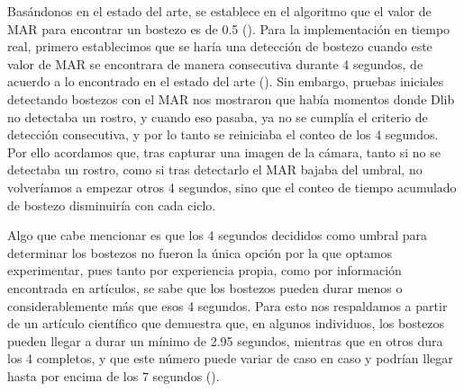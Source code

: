 Basándonos en el estado del arte, se establece en el algoritmo que el valor de MAR para encontrar un bostezo es de 0.5 (\cite{Bostezo}). Para la implementación en tiempo real, primero establecimos que se haría una detección de bostezo cuando este valor de MAR se encontrara de manera consecutiva durante 4 segundos, de acuerdo a lo encontrado en el estado del arte (\cite{Bostezo}). Sin embargo, pruebas iniciales detectando bostezos con el MAR nos mostraron que había momentos donde Dlib no detectaba un rostro, y cuando eso pasaba, ya no se cumplía el criterio de detección consecutiva, y por lo tanto se reiniciaba el conteo de los 4 segundos. Por ello acordamos que, tras capturar una imagen de la cámara, tanto si no se detectaba un rostro, como si tras detectarlo el MAR bajaba del umbral, no volveríamos a empezar otros 4 segundos, sino que el conteo de tiempo acumulado de bostezo disminuiría con cada ciclo. 

Algo que cabe mencionar es que los 4 segundos decididos como umbral para determinar los bostezos no fueron la única opción por la que optamos experimentar, pues tanto por experiencia propia, como por información encontrada en artículos, se sabe que los bostezos pueden durar menos o considerablemente más que esos 4 segundos. Para esto nos respaldamos a partir de un artículo científico que demuestra que, en algunos individuos, los bostezos pueden llegar a durar un mínimo de 2.95 segundos, mientras que en otros dura los 4 completos, y que este número puede variar de caso en caso y podrían llegar hasta por encima de los 7 segundos (\cite{Duracion_Bostezo}).

